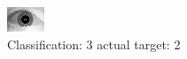 \begin{figure}[h!]
\begin{center}
\includegraphics[width=0.60\columnwidth]{figures/ID1645_class_3_target_2.png}
\end{center}
\caption{ Classification: 3 actual target: 2}
\label{fig:ID1645_class_3_target_2}
\end{figure}
